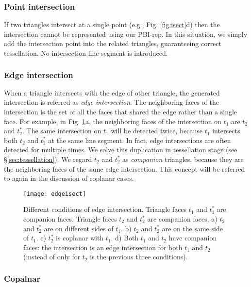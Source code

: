 \subsubsection{Point intersection}
\label{sec:ipoint}

If two triangles intersect at a single point (e.g., Fig. \ref{fig:isect}d) then the intersection cannot be represented using our PBI-rep. In this situation, we simply add the intersection point into the related triangles, guaranteeing correct tessellation. No intersection line segment is introduced.

\subsubsection{Edge intersection}


When a triangle intersects with the edge of other triangle, the generated intersection is referred as \emph{edge intersection}. The neighboring faces of the intersection is the set of all the faces that shared the edge rather than a single face. For example, in Fig. \ref{fig:twin}a, the neighboring faces of the intersection on $t_1$ are $t_2$ and $t^*_2$. The same intersection on $t_1$ will be detected twice, because $t_1$ intersects both $t_2$ and $t_2^*$ at the same line segment. In fact, edge intersections are often detected for multiple times. We solve this duplication in tessellation stage (see \S\ref{sec:tessellation}). We regard $t_2$ and $t_2^*$ as \emph{companion} triangles, because they are the neighboring faces of the same edge intersection. This concept will be referred to again in the discussion of coplanar cases.

\begin{figure}[t]
\centering
\texttt{[image: edgeisect]}
\caption{Different conditions of edge intersection. Triangle faces $t_1$ and $t_1^*$ are companion faces. Triangle faces $t_2$ and $t_2^*$ are companion faces. a) $t_2$ and $t_2^*$ are on different sides of $t_1$. b) $t_2$ and $t_2^*$ are on the same side of $t_1$. c) $t_2^*$ is coplanar with $t_1$. d) Both $t_1$ and $t_2$ have companion faces: the intersection is an edge intersection for both $t_1$ and $t_2$ (instead of only for $t_2$ is the previous three conditions). }
\label{fig:twin}
\end{figure}


\subsubsection{Copalnar}

